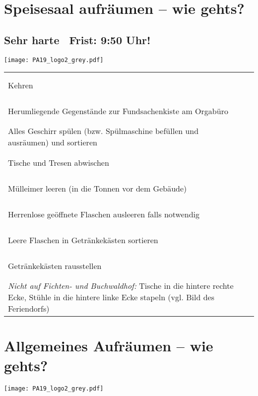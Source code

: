 \documentclass[14pt,parskip=full+]{scrartcl}
\newcommand{\checkfield}{~ \hfill ~\raisebox{-5pt}{\tikz\node[draw,minimum width=16.8pt,minimum height=16.8pt]{};}}
\begin{document}
\parbox[t]{.8\textwidth}{\vskip0pt
\section*{Speisesaal aufr\"aumen -- wie gehts?}
\subsection*{Sehr harte\footnotemark~ Frist: 9:50 Uhr!}
}
\parbox[t]{.2\textwidth}{\vskip0pt 
\texttt{[image: PA19\_logo2\_grey.pdf]}}%

\bigskip

\def\arraystretch{1.3}

\begin{tabularx}{\textwidth}{Xc}
 Kehren & \checkfield \\
 Herumliegende Gegenstände zur Fundsachenkiste am Orgabüro & \checkfield \\
 Alles Geschirr spülen (bzw. Spülmaschine befüllen und ausräumen) und sortieren & \checkfield \\
 Tische und Tresen abwischen & \checkfield \\
 M\"ulleimer leeren (in die Tonnen vor dem Gebäude) & \checkfield \\
 Herrenlose ge\"offnete Flaschen ausleeren falls notwendig & \checkfield \\
 Leere Flaschen in Getr\"ankek\"asten sortieren & \checkfield \\
 Getr\"ankek\"asten rausstellen & \checkfield \\
 \textit{Nicht auf Fichten- und Buchwaldhof:} Tische in die hintere rechte Ecke, St\"uhle in die hintere linke Ecke stapeln (vgl. Bild des Feriendorfs)& \checkfield
\end{tabularx}




\vspace{2cm}




\parbox[t]{.8\textwidth}{\vskip0pt
\section*{Allgemeines Aufr\"aumen -- wie gehts?}
}
\parbox[t]{.2\textwidth}{\vskip0pt 
\texttt{[image: PA19\_logo2\_grey.pdf]}}%
\end{document}
